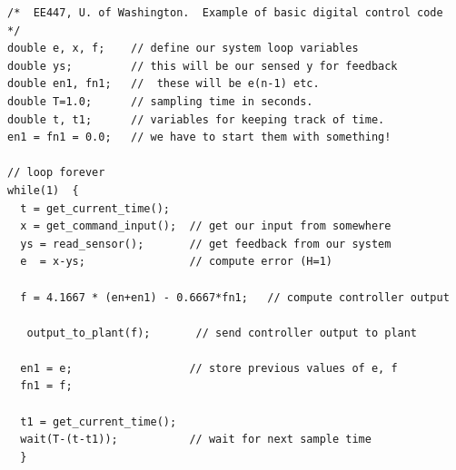 %
%
%
%
%
%
%
%
%
%
\lstset{numbers=left, numberstyle=\tiny, stepnumber=1, numbersep=5pt}
\lstset{language=C}
\begin{lstlisting}
/*  EE447, U. of Washington.  Example of basic digital control code  */
double e, x, f;    // define our system loop variables
double ys;         // this will be our sensed y for feedback
double en1, fn1;   //  these will be e(n-1) etc.
double T=1.0;      // sampling time in seconds.
double t, t1;      // variables for keeping track of time.
en1 = fn1 = 0.0;   // we have to start them with something!

// loop forever
while(1)  {
  t = get_current_time();
  x = get_command_input();  // get our input from somewhere
  ys = read_sensor();       // get feedback from our system
  e  = x-ys;                // compute error (H=1)

  f = 4.1667 * (en+en1) - 0.6667*fn1;   // compute controller output

   output_to_plant(f);       // send controller output to plant

  en1 = e;                  // store previous values of e, f
  fn1 = f;

  t1 = get_current_time();
  wait(T-(t-t1));           // wait for next sample time
  }
\end{lstlisting}

